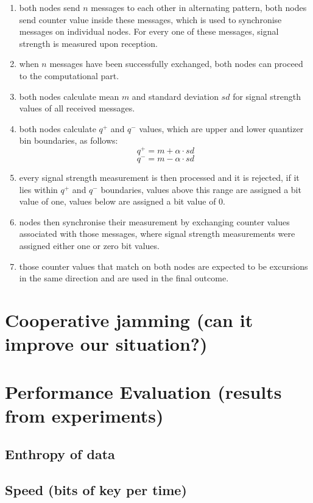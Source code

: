 \documentclass[
  digital, %
  table,   %
  nolof,     %
  nolot,     %
           oneside
]{fithesis3}
\begin{document}
    \begin{enumerate}
      \item both nodes send $n$ messages to each other in alternating pattern, both nodes send counter value inside these messages, which is used to synchronise messages on individual nodes. For every one of these messages, signal strength is measured upon reception.
      \item when $n$ messages have been successfully exchanged, both nodes can proceed to the computational part.
      \item both nodes calculate mean $m$ and standard deviation $sd$ for signal strength values of all received messages.
      \item both nodes calculate $q^+$ and $q^-$ values, which are upper and lower quantizer bin boundaries, as follows:
      $$q^+ = m + \alpha \cdot sd$$
      $$q^- = m - \alpha \cdot sd$$
      \item every signal strength measurement is then processed and it is rejected, if it lies within $q^+$ and $q^-$ boundaries, values above this range are assigned a bit value of one, values below are assigned a bit value of 0.
      \item nodes then synchronise their measurement by exchanging counter values associated with those messages, where signal strength measurements were assigned either one or zero bit values.
      \item those counter values that match on both nodes are expected to be excursions in the same direction and are used in the final outcome.

    \end{enumerate}
  \section{Cooperative jamming (can it improve our situation?)}


  \section{Performance Evaluation (results from experiments)}
    \subsection{Enthropy of data}
    \subsection{Speed (bits of key per time)}
\end{document}

